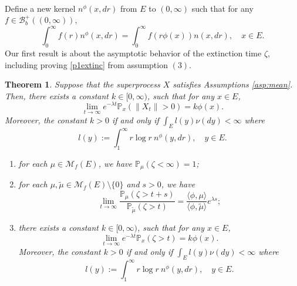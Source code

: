 \documentclass[12pt,a4paper]{amsart}
\numberwithin{equation}{section}
\theoremstyle{plain}
\newtheorem{thm}{Theorem}[section]
\theoremstyle{definition}
\theoremstyle{remark}
\begin{document}
\hspace*{10pt}\\
Define a new kernel $n^\phi(x, dr)$ from $E$ to $(0,\infty)$ such that for any $f\in\mathcal B_b^+((0,\infty))$,
\begin{equation} \label{phi-change}
	\int_0^\infty f(r)n^\phi(x,dr)=\int_0^\infty f(r\phi(x))n(x, dr),
	\quad x\in E.
\end{equation}
{\color{gray}
	Our first result is about the asymptotic behavior of the extinction time $\zeta$, including proving \eqref{p1extinc} from assumption $(3)$. 
}
\begin{thm}\label{thm:E}
{\color{red}
	Suppose that the superprocess $X$ satisfies Assumptions \ref{asp:mean}. Then,
	there exists a constant $k\in [0,\infty)$, such that for any $x\in E$,
	\begin{equation}\label{decay rate}
	\lim_{t\rightarrow\infty} e^{-\lambda t}\mathbb P_x(\|X_t\|>0)=k\phi(x).
	\end{equation}
	Moreover, the constant $k>0$ if and only if $\int_E l(y)\nu(dy)<\infty$ where
	\begin{equation}\label{def: m}
	l(y):=\int_1^\infty r\log r~n^\phi(y, dr),\quad y \in E.
	\end{equation}
}
{\color{gray}
\begin{enumerate}
\item \label{subthm: extinct as sure}
	for each $\mu \in \mathcal M_f(E)$, we have  $\mathbb P_\mu(\zeta<\infty)=1$;
\item
 	for each $\mu,\tilde\mu\in \mathcal M_f(E)\setminus\{0\}$ and $s>0$, we have
 \[
 	\lim_{t\rightarrow\infty}\dfrac{\mathbb P_{\mu}(\zeta>t+s)}{\mathbb P_{\tilde\mu}(\zeta>t)}=\frac{\langle \phi,\mu\rangle }{\langle \phi,\tilde\mu\rangle }e^{\lambda s};
 \]
 \item
 	there exists a constant $k\in [0,\infty)$, such that for any $x\in E$,
\begin{equation}\label{decay rate}
	\lim_{t\rightarrow\infty} e^{-\lambda t}\mathbb P_x(\zeta>t)=k\phi(x).
\end{equation}
	Moreover, the constant $k>0$ if and only if $\int_E l(y)\nu(dy)<\infty$ where
\begin{equation}\label{def: m}
	l(y):=\int_1^\infty r\log r~n^\phi(y, dr),\quad y \in E.
\end{equation}
\end{enumerate}
}
\end{thm}
\end{document}

